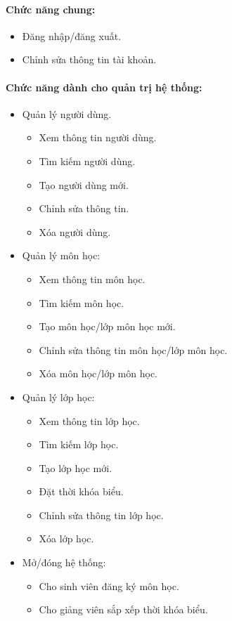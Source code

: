 \documentclass{article}
\begin{document}
    \paragraph{Chức năng chung:}
    \begin{itemize}
      \item Đăng nhập/đăng xuất.
      \item Chỉnh sửa thông tin tài khoản.
    \end{itemize}

    \paragraph{Chức năng dành cho quản trị hệ thống:}
    \begin{itemize}
      \item Quản lý người dùng.
      \begin{itemize}
        \item Xem thông tin người dùng.
        \item Tìm kiếm người dùng.
        \item Tạo người dùng mới.
        \item Chỉnh sửa thông tin.
        \item Xóa người dùng.
      \end{itemize}
      \item Quản lý môn học:
      \begin{itemize}
        \item Xem thông tin môn học.
        \item Tìm kiếm môn học.
        \item Tạo môn học/lớp môn học mới.
        \item Chỉnh sửa thông tin môn học/lớp môn học.
        \item Xóa môn học/lớp môn học.
      \end{itemize}
      \item Quản lý lớp học:
      \begin{itemize}
        \item Xem thông tin lớp học.
        \item Tìm kiếm lớp học.
        \item Tạo lớp học mới.
        \item Đặt thời khóa biểu.
        \item Chỉnh sửa thông tin lớp học.
        \item Xóa lớp học.
      \end{itemize}
      \item Mở/đóng hệ thống:
      \begin{itemize}
        \item Cho sinh viên đăng ký môn học.
        \item Cho giảng viên sắp xếp thời khóa biểu.
      \end{itemize}
    \end{itemize}
\end{document}
